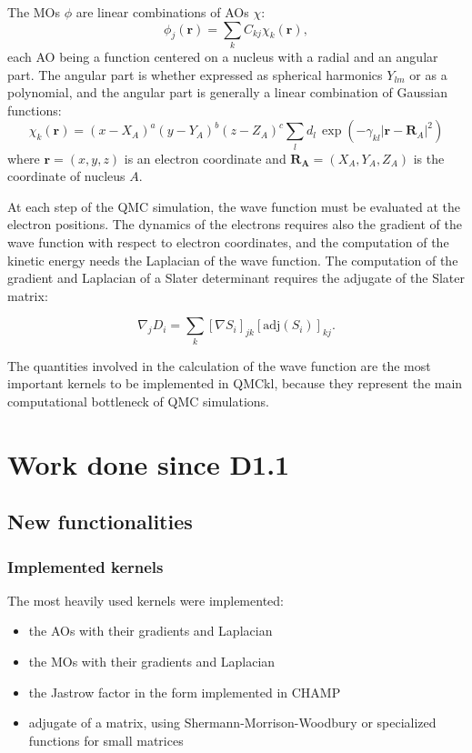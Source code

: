 The \acp{MO} $\phi$ are linear combinations of \acp{AO} $\chi$:
\begin{equation}
\phi_j(\mathbf{r}) = \sum_k C_{kj} \chi_k(\mathbf{r}),
\end{equation}
each \ac{AO} being a function centered on a nucleus with a radial and an angular part.
The angular part is whether expressed as spherical harmonics $Y_{lm}$ or as a polynomial, and
the angular part is generally a linear combination of Gaussian functions:
\begin{equation}
\chi_k(\mathbf{r}) = (x-X_A)^a (y-Y_A)^b (z-Z_A)^c \sum_l d_l\, \exp \left(
    -\gamma_{kl} |\mathbf{r}-\mathbf{R}_A|^2 \right)
\end{equation}
where $\mathbf{r} = (x,y,z)$ is an electron coordinate and 
$\mathbf{R_A} = (X_A,Y_A,Z_A)$ is the coordinate of nucleus $A$.

At each step of the \ac{QMC} simulation, the wave function must be
evaluated at the electron positions. The dynamics of the electrons
requires also the gradient of the wave function with respect to electron
coordinates, and the computation of the kinetic energy needs the Laplacian
of the wave function. The computation of the gradient and Laplacian of
a Slater determinant requires the adjugate of the Slater matrix:

\begin{equation}
  \nabla_j D_i = \sum_k \left[\nabla S_i \right]_{jk} \left[\mathrm{adj}(S_i)\right]_{kj}.
\end{equation}


The quantities involved in the calculation of the wave function are the most
important kernels to be implemented in QMCkl, because they represent the main
computational bottleneck of \ac{QMC} simulations.


\section{Work done since D1.1}

\subsection{New functionalities}

\subsubsection{Implemented kernels}

The most heavily used kernels were implemented:
\begin{itemize}
  \item the \acp{AO} with their gradients and Laplacian
  \item the \acp{MO} with their gradients and Laplacian
  \item the Jastrow factor in the form implemented in CHAMP
  \item adjugate of a matrix, using Shermann-Morrison-Woodbury or
    specialized functions for small matrices
\end{itemize}    

